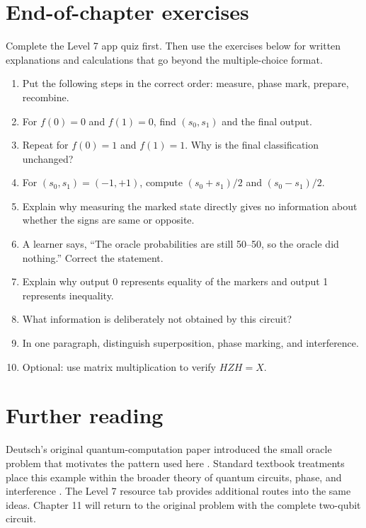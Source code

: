 \section{End-of-chapter exercises}
\label{sec:ch07-exercises}

Complete the Level 7 app quiz first. Then use the exercises below for written explanations and calculations that go beyond the multiple-choice format.

\begin{enumerate}
  \item Put the following steps in the correct order: measure, phase mark, prepare, recombine.
  \item For $f(0)=0$ and $f(1)=0$, find $(s_0,s_1)$ and the final output.
  \item Repeat for $f(0)=1$ and $f(1)=1$. Why is the final classification unchanged?
  \item For $(s_0,s_1)=(-1,+1)$, compute $(s_0+s_1)/2$ and $(s_0-s_1)/2$.
  \item Explain why measuring the marked state directly gives no information about whether the signs are same or opposite.
  \item A learner says, ``The oracle probabilities are still 50--50, so the oracle did nothing.'' Correct the statement.
  \item Explain why output 0 represents equality of the markers and output 1 represents inequality.
  \item What information is deliberately not obtained by this circuit?
  \item In one paragraph, distinguish superposition, phase marking, and interference.
  \item Optional: use matrix multiplication to verify $H Z H=X$.
\end{enumerate}

\section{Further reading}
\label{sec:ch07-further-reading}

Deutsch's original quantum-computation paper introduced the small oracle problem that motivates the pattern used here \citep{deutsch1985quantumTheory}. Standard textbook treatments place this example within the broader theory of quantum circuits, phase, and interference \citep{nielsenChuang2010,mermin2007quantumComputerScience}. The Level 7 resource tab provides additional routes into the same ideas. Chapter 11 will return to the original problem with the complete two-qubit circuit.
